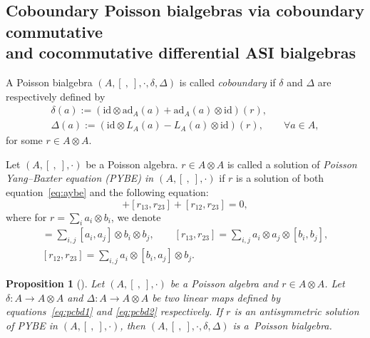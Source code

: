 \documentclass[pdftex]{sigma}
\numberwithin{equation}{section}
\newtheorem{Proposition}[Theorem]{Proposition}
{ \theoremstyle{definition}
	\newtheorem{Definition}[Theorem]{Definition}
	\newtheorem{Note}[Theorem]{Note}
	\newtheorem{Example}[Theorem]{Example}
	\newtheorem{Remark}[Theorem]{Remark} }
\newcommand{\ad}{\mathrm{ad}}
\newcommand{\id}{\mathrm{id}}
\begin{document}
\subsection[Coboundary Poisson bialgebras via coboundary commutative and cocommutative differential ASI bialgebras]{Coboundary Poisson bialgebras via coboundary commutative\\ and cocommutative differential ASI bialgebras}

\begin{Definition}
 A Poisson bialgebra $(A, [\ ,\ ], \cdot, \delta, \Delta)$ is called \textit{coboundary}
 if $\delta$ and $\Delta$ are respectively defined by
	\begin{gather}
 \delta(a) := (\id \otimes \ad_A(a) + \ad_A(a) \otimes \id )(r), \label{eq:pcbd1}\\
 \Delta(a) := (\id \otimes L_A(a) - L_A(a) \otimes \id)(r), \qquad \forall a \in A,\label{eq:pcbd2}
 \end{gather}
for some $r \in A \otimes A$.
\end{Definition}

\begin{Definition}
 Let $(A, [\ ,\ ], \cdot)$ be a Poisson algebra.
 $r \in A \otimes A$ is called a solution of \textit{Poisson Yang--Baxter equation (PYBE) in $(A, [\ ,\ ], \cdot)$} if $r$ is a solution of both equation~\eqref{eq:aybe} and the following equation:
 \begin{equation}
 [r_{12}, r_{13}] + [r_{13}, r_{23}] + [r_{12}, r_{23}] = 0, \label{eq:CYBE}
 \end{equation}
 where for $r = \sum_i a_i \otimes b_i$, we denote
 \begin{gather*}
 [r_{12}, r_{13}] = \sum_{i,j} [a_i, a_j] \otimes b_i \otimes b_j, \qquad
 [r_{13}, r_{23}] = \sum_{i,j} a_i \otimes a_j \otimes [b_i, b_j], \\
 [r_{12},r_{23}] = \sum_{i,j} a_i \otimes [b_i, a_j] \otimes b_j.
 \end{gather*}
\end{Definition}

\begin{Proposition}[{\cite[Theorem~2]{ni2013poisson}}]\label{pro:pybebi}
Let $(A, [\ ,\ ], \cdot)$ be a Poisson algebra and $r \in A \otimes A$.
 Let $\delta\colon A \to A \otimes A$ and $\Delta\colon A \to A \otimes A$ be two linear maps defined by equations~\eqref{eq:pcbd1} and \eqref{eq:pcbd2} respectively.
 If $r$ is an antisymmetric solution of PYBE in $(A, [\ ,\ ], \cdot)$,
 then $(A, [\ ,\ ], \cdot, \delta, \Delta)$ is a~Poisson bialgebra.
\end{Proposition}
\end{document}
